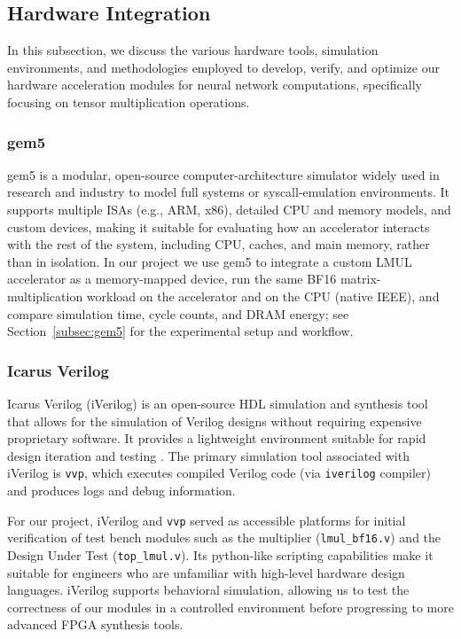 \documentclass[12pt,letterpaper]{article}
\begin{document}
\subsection{Hardware Integration}

In this subsection, we discuss the various hardware tools, simulation environments, and methodologies employed to develop, verify, and optimize our hardware acceleration modules for neural network computations, specifically focusing on tensor multiplication operations.

\subsubsection{gem5}
gem5 is a modular, open-source computer-architecture simulator widely used in research and industry to model full systems or syscall-emulation environments. It supports multiple ISAs (e.g., ARM, x86), detailed CPU and memory models, and custom devices, making it suitable for evaluating how an accelerator interacts with the rest of the system, including CPU, caches, and main memory, rather than in isolation. In our project we use gem5 to integrate a custom LMUL accelerator as a memory-mapped device, run the same BF16 matrix-multiplication workload on the accelerator and on the CPU (native IEEE), and compare simulation time, cycle counts, and DRAM energy; see Section~\ref{subsec:gem5} for the experimental setup and workflow.


\subsubsection{Icarus Verilog}

Icarus Verilog (iVerilog) is an open-source HDL simulation and synthesis tool that allows for the simulation of Verilog designs without requiring expensive proprietary software. It provides a lightweight environment suitable for rapid design iteration and testing \cite{iverilog}. The primary simulation tool associated with iVerilog is \texttt{vvp}, which executes compiled Verilog code (via \texttt{iverilog} compiler) and produces logs and debug information.

For our project, iVerilog and \texttt{vvp} served as accessible platforms for initial verification of test bench modules such as the multiplier (\texttt{lmul\_bf16.v}) and the Design Under Test (\texttt{top\_lmul.v}). Its python-like scripting capabilities make it suitable for engineers who are unfamiliar with high-level hardware design languages. iVerilog supports behavioral simulation, allowing us to test the correctness of our modules in a controlled environment before progressing to more advanced FPGA synthesis tools.
\end{document}
